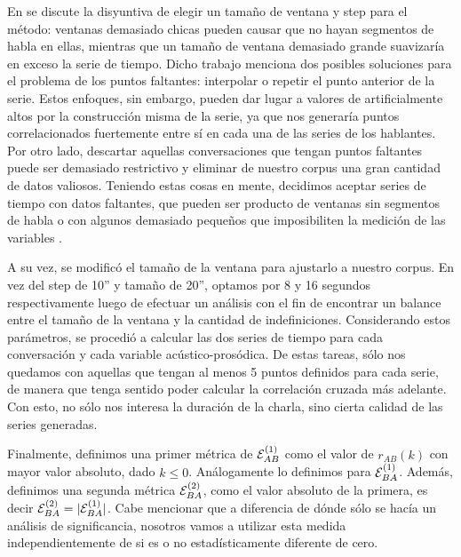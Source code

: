 En \cite{KOU2008.2} se discute la disyuntiva de elegir un tamaño de ventana y step para el método: ventanas demasiado chicas pueden causar que no hayan segmentos de habla en ellas, mientras que un tamaño de ventana demasiado grande suavizaría en exceso la serie de tiempo. Dicho trabajo menciona dos posibles soluciones para el problema de los puntos faltantes: interpolar\cite{DEL2013} o repetir el punto anterior de la serie. Estos enfoques, sin embargo, pueden dar lugar a valores de \entrainment artificialmente altos  por la construcción misma de la serie, ya que nos generaría puntos correlacionados fuertemente entre sí en cada una de las series de los hablantes. Por otro lado, descartar aquellas conversaciones que tengan puntos faltantes puede ser demasiado restrictivo y eliminar de nuestro corpus una gran cantidad de datos valiosos. Teniendo estas cosas en mente, decidimos aceptar series de tiempo con datos faltantes, que pueden ser producto de ventanas sin segmentos de habla o con algunos demasiado pequeños que imposibiliten la medición de las variables \ap.

A su vez, se modificó el tamaño de la ventana para ajustarlo a nuestro corpus. En vez del step de 10'' y tamaño de 20'', optamos por 8 y 16 segundos respectivamente luego de efectuar un análisis con el fin de encontrar un balance entre el tamaño de la ventana y la cantidad de indefiniciones. Considerando estos parámetros, se procedió a calcular las dos series de tiempo para cada conversación y cada variable acústico-prosódica. De estas tareas, sólo nos quedamos con aquellas que tengan al menos 5 puntos definidos para cada serie, de manera que tenga sentido poder calcular la correlación cruzada más adelante. Con esto, no sólo nos interesa la duración de la charla, sino cierta calidad de las series generadas.

Finalmente, definimos una primer métrica de \entrainment $\mathcal{E}_{AB}^{(1)}$ como el valor de $r_{AB}(k)$ con mayor valor absoluto, dado $k \leq 0$. Análogamente lo definimos para $\mathcal{E}_{BA}^{(1)}$. Además, definimos una segunda métrica $\mathcal{E}_{BA}^{(2)}$, como el valor absoluto de la primera, es decir $\mathcal{E}_{BA}^{(2)} = |\mathcal{E}_{BA}^{(1)}|$. Cabe mencionar que a diferencia de \cite{KOU2008.2} dónde sólo se hacía un análisis de significancia, nosotros vamos a utilizar esta medida independientemente de si es o no estadísticamente diferente de cero.

